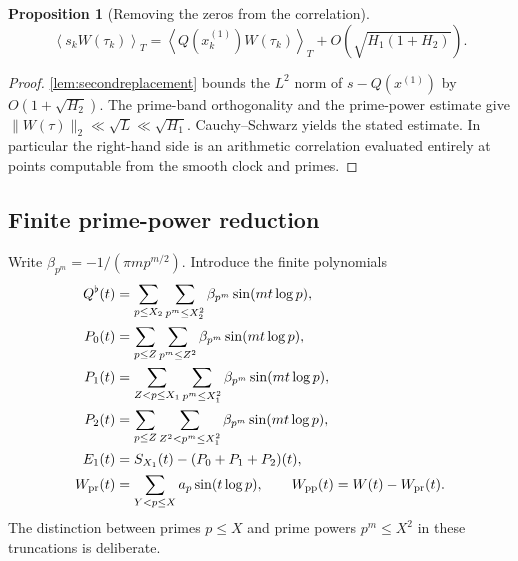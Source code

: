 \documentclass[11pt,reqno]{amsart}
\numberwithin{equation}{section}
\newtheorem{proposition}[theorem]{Proposition}
\newcommand{\av}[1]{\left\langle #1\right\rangle_T}
\begin{document}
\begin{proposition}[Removing the zeros from the correlation]
\label{prop:reduceB}
\begin{equation}\label{eq:reduceB}
\av{s_kW(\tau_k)}=
\av{Q(x_k^{(1)})W(\tau_k)}
 +O(\sqrt{H_1(1+H_2)}).
\end{equation}
\end{proposition}
\begin{proof}
\cref{lem:secondreplacement} bounds the $L^2$ norm of
$s-Q(x^{(1)})$ by $O(1+\sqrt{H_2})$.
The prime-band orthogonality and the prime-power estimate give
$\|W(\tau)\|_2\ll\sqrt L\ll\sqrt{H_1}$.
Cauchy--Schwarz yields the stated estimate.  In particular the
right-hand side is an arithmetic correlation evaluated entirely at
points computable from the smooth clock and primes.
\end{proof}


\subsection{Finite prime-power reduction}
Write $\beta_{p^m}=-1/(\pi m p^{m/2})$.  Introduce the
finite polynomials
\begin{equation}\label{eq:truncations}
\begin{split}
Q^\flat(t)&=\sum_{p\le X_2}\sum_{p^m\le X_2^2}
 \beta_{p^m}\sin(mt\log p),\\
P_0(t)&=\sum_{p\le Z}\sum_{p^m\le Z^2}
 \beta_{p^m}\sin(mt\log p),\\
P_1(t)&=\sum_{Z<p\le X_1}\sum_{p^m\le X_1^2}
 \beta_{p^m}\sin(mt\log p),\\
P_2(t)&=\sum_{p\le Z}\sum_{Z^2<p^m\le X_1^2}
 \beta_{p^m}\sin(mt\log p),\\
E_1(t)&=S_{X_1}(t)-(P_0+P_1+P_2)(t),\\
W_{\rm pr}(t)&=\sum_{Y<p\le X}a_p\sin(t\log p),
\qquad W_{\rm pp}(t)=W(t)-W_{\rm pr}(t).
\end{split}
\end{equation}
The distinction between primes $p\le X$ and prime powers
$p^m\le X^2$ in these truncations is deliberate.
\end{document}
